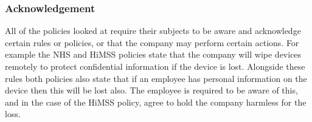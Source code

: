 \documentclass{llncs}
\newenvironment{policyrule}[1]{%
  \begin{mdframed}\footnotesize
      \noindent\textbf{\sffamily #1}:~\itshape%
}{%
  \end{mdframed}
}
\begin{document}
\subsubsection{Acknowledgement}

All of the policies looked at require their subjects to be aware and acknowledge certain rules or policies, 
  or that the company may perform certain actions.
For example the NHS and HiMSS policies state that the company will wipe devices remotely to protect confidential information if the device is lost.
Alongside these rules both policies also state that if an employee has personal information on the device then this will be lost also.
The employee is required to be aware of this, and in the case of the HiMSS policy, agree to hold the company harmless for the loss.

\end{document}
